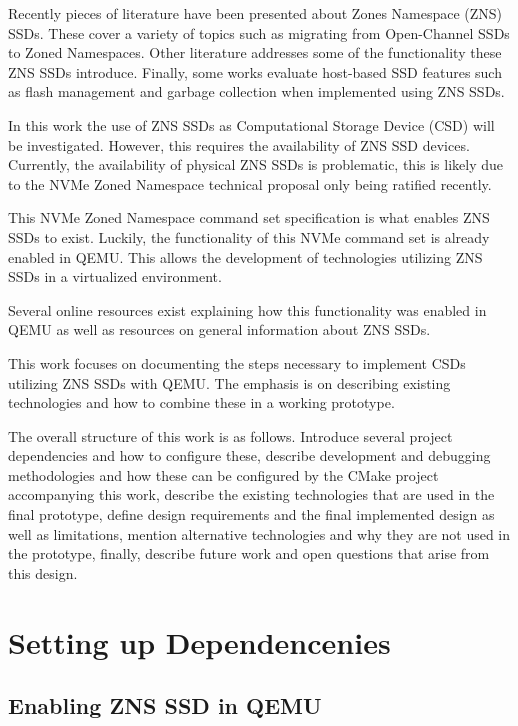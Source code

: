 \documentclass[conference]{IEEEtran}
\begin{document}
Recently pieces of literature have been presented about Zones Namespace (ZNS)
SSDs. These cover a variety of topics such as migrating from Open-Channel
SSDs to Zoned Namespaces\cite{bjorling2019open}. Other literature addresses
some of the  functionality these ZNS SSDs introduce\cite{bjorling2020zone}.
Finally, some works evaluate host-based SSD features such as flash management
and  garbage collection when implemented using ZNS SSDs\cite{254268,9188086}.

In this work the use of ZNS SSDs as Computational Storage Device (CSD) will be
investigated. However, this requires the availability of ZNS SSD devices.
Currently, the availability of physical ZNS SSDs is problematic, this is
likely  due to the NVMe Zoned Namespace technical proposal only being ratified
recently\cite{zns-nvme-ratified}.

This NVMe Zoned Namespace command set specification is what enables ZNS SSDs to
exist\cite{nvme-zns}. Luckily, the functionality of this NVMe command set is
already enabled in QEMU. This allows the development of technologies utilizing
ZNS SSDs in a virtualized environment.

Several online resources exist explaining how this functionality was enabled in
QEMU\cite{nvme-qemu-1,nvme-qemu-2} as well as resources on general information
about ZNS SSDs\cite{zns-info}.

This work focuses on documenting the steps necessary to implement CSDs
utilizing ZNS SSDs with QEMU. The emphasis is on describing existing
technologies and how to combine these in a working prototype.

The overall structure of this work is as follows. Introduce several project
dependencies and how to configure these, describe development and debugging
methodologies and how these can be configured by the CMake project accompanying
this work, describe the existing technologies that are used in the final
prototype, define design requirements and the final implemented design as well
as limitations, mention alternative technologies and why they are not used in
the prototype, finally, describe future work and open questions that arise from
this design.

\section{Setting up Dependencenies}

\subsection{Enabling ZNS SSD in QEMU}
\end{document}

